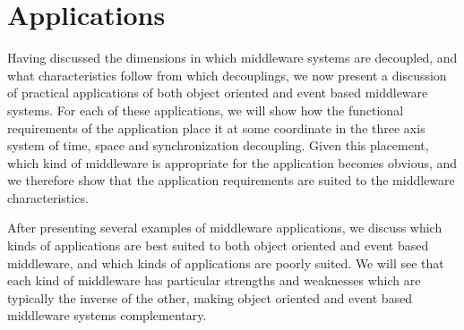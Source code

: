 \documentclass{acm_proc_article-sp}
\begin{document}
% 
% 
% 
% 
% 
% 
% 
% 
% 



\section{Applications}
\label{sec:apps}

Having discussed the dimensions in which middleware systems are decoupled, and what characteristics follow from which decouplings, we now present a discussion of practical applications of both object oriented and event based middleware systems. For each of these applications, we will show how the functional requirements of the application place it at some coordinate in the three axis system of time, space and synchronization decoupling. Given this placement, which kind of middleware is appropriate for the application becomes obvious, and we therefore show that the application requirements are suited to the middleware characteristics. 

After presenting several examples of middleware applications, we discuss which kinds of applications are best suited to both object oriented and event based middleware, and which kinds of applications are poorly suited. We will see that each kind of middleware has particular strengths and weaknesses which are typically the inverse of the other, making object oriented and event based middleware systems complementary. 
\end{document}
